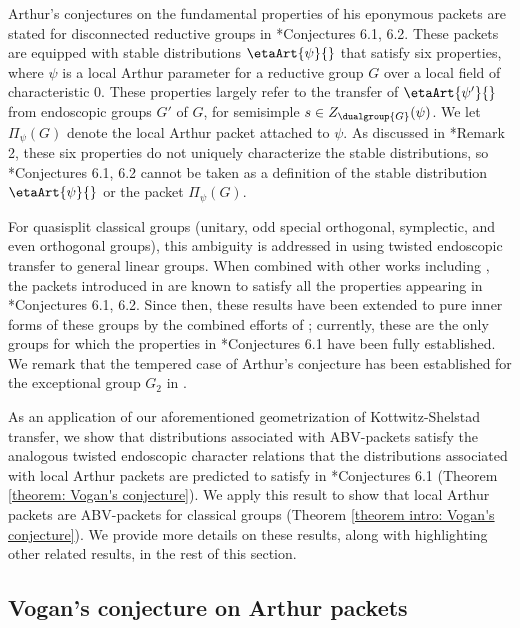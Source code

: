 \documentclass[11pt,letterpaper]{amsart}
\numberwithin{equation}{section}
\begin{document}
Arthur's conjectures on the fundamental properties of his eponymous packets are stated for disconnected reductive groups in \cite{Art89}*{Conjectures 6.1, 6.2}.
These packets are equipped with stable distributions $\etaArt{\psi}{}$ that satisfy six properties, where $\psi$ is a local Arthur parameter for a reductive group $G$ over a local field of characteristic 0. These properties largely refer to the transfer of $\etaArt{\psi'}{}$ from endoscopic groups $G'$ of $G$, for semisimple $s\in Z_{\dualgroup{G}}(\psi)$.  We let $\Pi_\psi(G)$ denote the local Arthur packet attached to $\psi$.
As discussed in \cite{Art89}*{Remark 2}, these six properties do not uniquely characterize the stable distributions, so  \cite{Art89}*{Conjectures 6.1, 6.2} cannot be taken as a definition of the stable distribution $\etaArt{\psi}{}$ or the packet $\Pi_{\psi}(G)$. 




For quasisplit classical groups
 (unitary, odd special orthogonal, symplectic, and even orthogonal groups), 
this ambiguity is addressed in \cites{Art13,Mok15}
using twisted endoscopic transfer to general linear groups.
When combined with other works including \cites{AGIKMS24, Hal26}, the packets introduced in \cites{Art13,Mok15} are known to satisfy all the properties appearing in \cite{Art89}*{Conjectures 6.1, 6.2}. 
Since then, these results have been extended to pure inner forms of these groups by the combined efforts of 
\cites{Art13,KMSW14,Mok15,AG17,MR18,Ish24, Hal26}; currently, these are the only groups for which the properties in \cite{Art89}*{Conjectures 6.1} have been fully established. We remark that the tempered case of Arthur's conjecture has been established for the exceptional group $G_2$ in \cite{Tak26}. 

{As an application of our aforementioned geometrization of Kottwitz-Shelstad transfer, we show that distributions associated with ABV-packets satisfy the analogous twisted endoscopic character relations that the distributions associated with local Arthur packets are predicted to satisfy in \cite{Art89}*{Conjectures 6.1} (Theorem \ref{theorem: Vogan's conjecture}). We apply this result to show that local Arthur packets are ABV-packets for classical groups (Theorem \ref{theorem intro: Vogan's conjecture}). We provide more details on these results, along with highlighting other related results, in the rest of this section.}

\subsection{Vogan's conjecture on Arthur packets}
\end{document}
